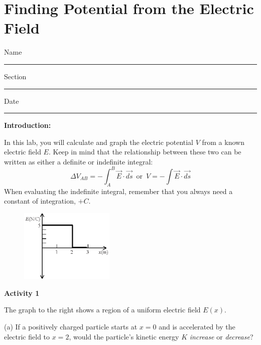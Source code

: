 
\section{Finding Potential from the Electric Field}

Name \rule{2.0in}{0.1pt}\hfill{}Section \rule{1.0in}{0.1pt}\hfill{}Date
\rule{1.0in}{0.1pt}

\vspace{0.4in}
\textbf{Introduction:}

In this lab, you will calculate and graph the electric potential $V$ from a known electric field $E$.  Keep in mind that the relationship between these two can be written as either a definite or indefinite integral:
\begin{displaymath}
\Delta V_{AB} = -\int_A^B{\vec{E} \cdot \vec{ds}} \, \textrm{ or } \,
V =-\int{\vec{E} \cdot \vec{ds}} 
\end{displaymath}
When evaluating the indefinite integral, remember that you always need a constant of integration, $+C$.  
\vspace{0.4in}

\begin{figure}
    \includegraphics[width=0.4\textwidth]{finding_v_from_e/fig1.eps}
\end{figure}

\textbf{Activity 1} 

The graph to the right shows a region of a uniform electric field $E(x)$.  

(a) If a positively charged particle starts at $x=0$ and is accelerated by the electric field to $x=2$, would the particle's kinetic energy $K$ \textit{increase} or \textit{decrease}?
\vspace{0.7in}

